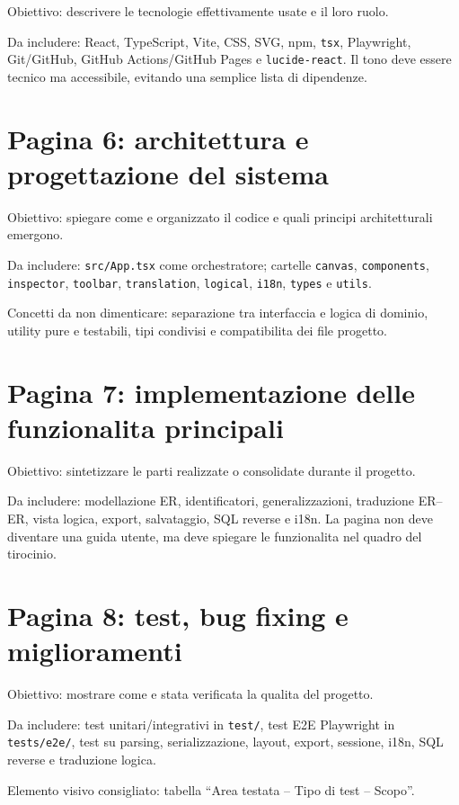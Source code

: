 Obiettivo: descrivere le tecnologie effettivamente usate e il loro ruolo.

Da includere: React, TypeScript, Vite, CSS, SVG, npm, \texttt{tsx}, Playwright, Git/GitHub, GitHub Actions/GitHub Pages e \texttt{lucide-react}. Il tono deve essere tecnico ma accessibile, evitando una semplice lista di dipendenze.

\section{Pagina 6: architettura e progettazione del sistema}

Obiettivo: spiegare come e organizzato il codice e quali principi architetturali emergono.

Da includere: \texttt{src/App.tsx} come orchestratore; cartelle \texttt{canvas}, \texttt{components}, \texttt{inspector}, \texttt{toolbar}, \texttt{translation}, \texttt{logical}, \texttt{i18n}, \texttt{types} e \texttt{utils}.

Concetti da non dimenticare: separazione tra interfaccia e logica di dominio, utility pure e testabili, tipi condivisi e compatibilita dei file progetto.

\section{Pagina 7: implementazione delle funzionalita principali}

Obiettivo: sintetizzare le parti realizzate o consolidate durante il progetto.

Da includere: modellazione ER, identificatori, generalizzazioni, traduzione ER--ER, vista logica, export, salvataggio, SQL reverse e i18n. La pagina non deve diventare una guida utente, ma deve spiegare le funzionalita nel quadro del tirocinio.

\section{Pagina 8: test, bug fixing e miglioramenti}

Obiettivo: mostrare come e stata verificata la qualita del progetto.

Da includere: test unitari/integrativi in \texttt{test/}, test E2E Playwright in \texttt{tests/e2e/}, test su parsing, serializzazione, layout, export, sessione, i18n, SQL reverse e traduzione logica.

Elemento visivo consigliato: tabella ``Area testata -- Tipo di test -- Scopo''.


